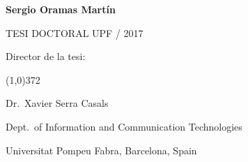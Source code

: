 \begin{titlingpage}
\begin{flushright}
  \vspace*{2cm}

  {\Large \textbf{Sergio Oramas Martín}}

   
  \vspace*{\fill} 
  TESI DOCTORAL UPF / 2017

\end{flushright}
  
  \vspace*{1.5cm}

  Director de la tesi:

  \vspace*{-0.25cm}

  \line(1,0){372}
  
  \vspace*{0.25cm}

  Dr.~Xavier Serra Casals

  Dept.~of Information and Communication Technologies

  Universitat Pompeu Fabra, Barcelona, Spain
  
\end{titlingpage}

